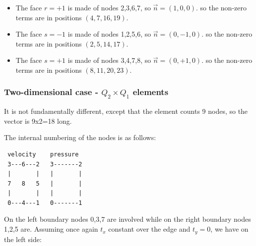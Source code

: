 \begin{itemize}
\item
The face $r=+1$ is made of nodes 2,3,6,7, so $\vec{n}=(1,0,0)$.
so the non-zero terms are in positions $(4,7,16,19)$.

\item
The face $s=-1$ is made of nodes 1,2,5,6, so $\vec{n}=(0,-1,0)$.
so the non-zero terms are in positions $(2,5,14,17)$.

\item
The face $s=+1$ is made of nodes 3,4,7,8, so $\vec{n}=(0,+1,0)$.
so the non-zero terms are in positions $(8,11,20,23)$.

\end{itemize}


\subsubsection{Two-dimensional case - $Q_2 \times Q_1$ elements}

It is not fundamentally different, except that the element counts 9 nodes, 
so the vector is 9x2=18 long. 

The internal numbering of the nodes is as follows:
\begin{verbatim}
 velocity    pressure
 3---6---2   3-------2
 |       |   |       |
 7   8   5   |       |
 |       |   |       |
 0---4---1   0-------1
\end{verbatim}

On the left boundary nodes 0,3,7 are involved while on the right 
boundary nodes 1,2,5 are.
Assuming once again $t_x$ constant over the edge and $t_y=0$, we
have on the left side:

